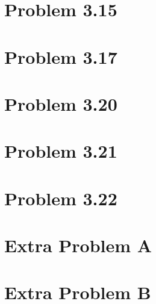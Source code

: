 \documentclass[11pt,a4paper,oneside]{report}
\begin{document}
\section*{Problem 3.15}


\section*{Problem 3.17}


\section*{Problem 3.20}


\section*{Problem 3.21}


\section*{Problem 3.22}


\section*{Extra Problem A}


\section*{Extra Problem B}
\end{document}
